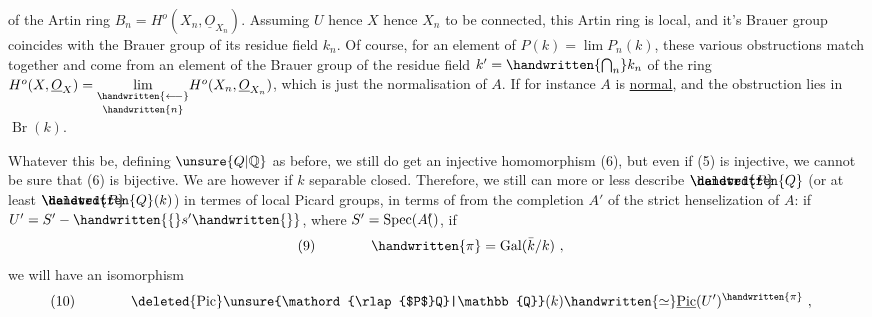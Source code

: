 of the Artin ring $B_n=H^o(X_n,\underline{O}_{X_n})$. Assuming $U$ hence $X$ hence $X_n$ to be connected, this Artin ring is local, and it's Brauer group coincides with the Brauer group of its residue field $k_n$. Of course,  for an element of $P(k)=\lim P_n(k)$, these various obstructions match together and come from an element of the Brauer group of the residue field $k'=\handwritten{\bigcap_n}k_n$ of the ring $H^o(X,\underline{O}_X)=\underset{\handwritten{n}}{\underset{\handwritten{\longleftarrow}}{\lim}}H^o(X_n,\underline{O}_{X_n})$,  which is just the normalisation of $A$. If for instance $A$ is \uline{normal},  and the obstruction lies in $\operatorname{Br}(k)$.

Whatever this be, defining $\unsure{Q|\mathbb{Q}}$ as before, we still do get an injective homomorphism (6), but even if (5) is injective, we cannot be sure that (6) is bijective. We are however if $k$  separable closed. Therefore, we still  can more or less describe $\mathord{\rlap{$\deleted{P}$}\handwritten{Q}}$ (or at least $\mathord{\rlap{$\deleted{P}$}\handwritten{Q}}(k)$) in termes of local Picard groups, in terms of  from the completion $A'$ of the strict henselization of $A$: if $U'=S'-\handwritten{\{}s'\handwritten{\}}$, where $S'=\operatorname{Spec}(A\mathord{\rlap{${}'$}(})$,  if
\[
\begin{aligned}
(9)\qquad\qquad & \handwritten{\pi}=\operatorname{Gal}(\bar{k}/k)\ ,
\end{aligned}
\]
we will have an isomorphism
\[
\begin{aligned}
(10)\qquad\qquad & \deleted{\operatorname{Pic}}\unsure{\mathord{\rlap{$P$}Q}|\mathbb{Q}}(k)\handwritten{\simeq}\underline{\operatorname{Pic}}(U')^{\handwritten{\pi}}\ ,
\end{aligned}
\]

